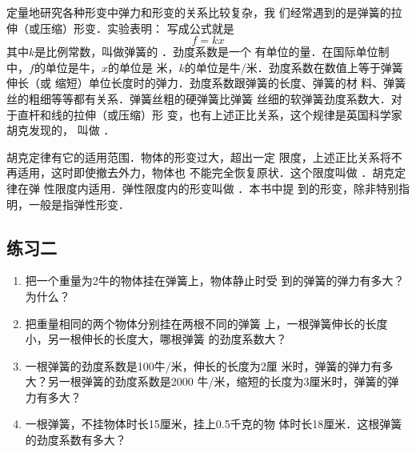     定量地研究各种形变中弹力和形变的关系比较复杂，我
们经常遇到的是弹簧的拉伸（或压缩）形变．实验表明： 
写成公式就是
\[f=kx\]
其中$k$是比例常数，叫做弹簧的 ．劲度系数是一个
有单位的量．在国际单位制中，$f$的单位是牛，$x$的单位是
米，$k$的单位是牛/米．劲度系数在数值上等于弹簧伸长（或
缩短）单位长度时的弹力．劲度系数跟弹簧的长度、弹簧的材
料、弹簧丝的粗细等等都有关系．弹簧丝粗的硬弹簧比弹簧
丝细的软弹簧劲度系数大．对于直杆和线的拉伸（或压缩）形
变，也有上述正比关系，这个规律是英国科学家胡克发现的，
叫做 ．

    胡克定律有它的适用范围．物体的形变过大，超出一定
限度，上述正比关系将不再适用，这时即使撤去外力，物体也
不能完全恢复原状．这个限度叫做 ．胡克定律在弹
性限度内适用．弹性限度内的形变叫做 ．本书中提
到的形变，除非特别指明，一般是指弹性形变．

\subsection*{练习二} 
\begin{enumerate} 
\item 把一个重量为2牛的物体挂在弹簧上，物体静止时受
到的弹簧的弹力有多大？为什么？
\item 把重量相同的两个物体分别挂在两根不同的弹簧
上，一根弹簧伸长的长度小，另一根伸长的长度大，哪根弹簧
的劲度系数大？
\item 一根弹簧的劲度系数是100牛/米，伸长的长度为2厘
米时，弹簧的弹力有多大？另一根弹簧的劲度系数是2000
牛/米，缩短的长度为3厘米时，弹簧的弹力有多大？
\item 一根弹簧，不挂物体时长15厘米，挂上0.5千克的物
体时长18厘米．这根弹簧的劲度系数有多大？
\end{enumerate} 

